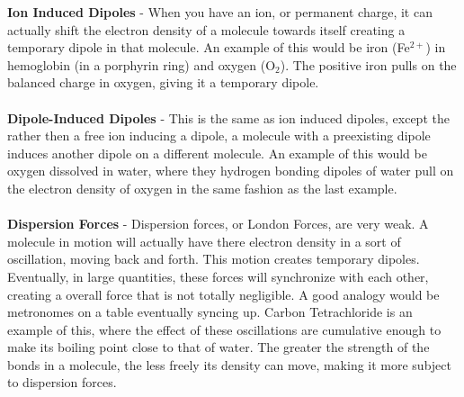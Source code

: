 \documentclass{article}
\begin{document}
\begin{minipage}[c]{0.6\textwidth}
\end{minipage}

\vspace{10pt}
\noindent \textbf{Ion Induced Dipoles} - When you have an ion, or permanent charge, it can actually shift the electron density of a molecule towards itself creating a temporary dipole in that molecule. An example of this would be iron (Fe$^{2+}$) in hemoglobin (in a porphyrin ring) and oxygen (O$_{2}$). The positive iron pulls on the balanced charge in oxygen, giving it a temporary dipole.\\
\\
\textbf{Dipole-Induced Dipoles} - This is the same as ion induced dipoles, except the rather then a free ion inducing a dipole, a molecule with a preexisting dipole induces another dipole on a different molecule. An example of this would be oxygen dissolved in water, where they hydrogen bonding dipoles of water pull on the electron density of oxygen in the same fashion as the last example.\\
\\
\textbf{Dispersion Forces} - Dispersion forces, or London Forces, are very weak. A molecule in motion will actually have there electron density in a sort of oscillation, moving back and forth. This motion creates temporary dipoles. Eventually, in large quantities, these forces will synchronize with each other, creating a overall force that is not totally negligible.  A good analogy would be metronomes on a table eventually syncing up. Carbon Tetrachloride is an example of this, where the effect of these oscillations are cumulative enough to make its boiling point close to that of water. The greater the strength of the bonds in a molecule, the less freely its density can move, making it more subject to dispersion forces.\\
\\
\pagebreak
\end{document}
